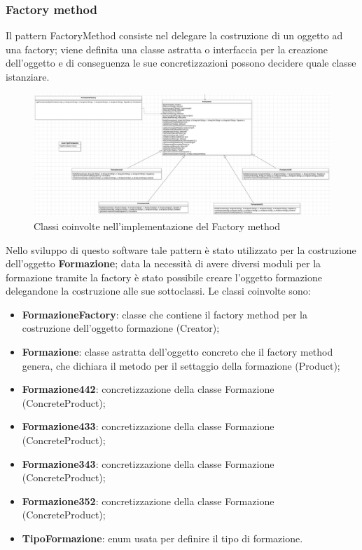 \documentclass[12pt,a4paper]{article}
\begin{document}
\subsubsection{Factory method}
Il pattern FactoryMethod consiste nel delegare la costruzione di un oggetto ad una factory; viene definita una classe astratta o interfaccia per la creazione dell'oggetto e di conseguenza le sue concretizzazioni possono decidere quale classe istanziare.
\begin{figure}[h]
\centering
\includegraphics[width=18 cm ,keepaspectratio]{FactoryMethod.png}
\caption{Classi coinvolte nell'implementazione del Factory method}
\end{figure}
\newline
Nello sviluppo di questo software tale pattern è stato utilizzato per la costruzione dell'oggetto \textbf{Formazione}; data la necessità di avere diversi moduli per la formazione tramite la factory è stato possibile creare l'oggetto formazione delegandone la costruzione alle sue sottoclassi. Le classi coinvolte sono:  
\begin{itemize}
\item \textbf{FormazioneFactory}: classe che contiene il factory method per la costruzione dell'oggetto formazione (Creator);
\item \textbf{Formazione}: classe astratta dell'oggetto concreto che il factory method genera, che dichiara il metodo per il settaggio della formazione (Product);
\item \textbf{Formazione442}: concretizzazione della classe Formazione  (ConcreteProduct);
\item \textbf{Formazione433}: concretizzazione della classe Formazione  (ConcreteProduct);
\item \textbf{Formazione343}: concretizzazione della classe Formazione  (ConcreteProduct);
\item \textbf{Formazione352}: concretizzazione della classe Formazione  (ConcreteProduct);
\item \textbf{TipoFormazione}: enum usata per definire il tipo di formazione.
\end{itemize}
\newpage
\end{document}

